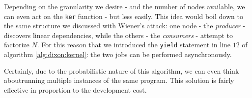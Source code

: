 Depending on the granularity we desire - and the number of nodes available, we
can even act on the \texttt{ker} function - but less easily.
This idea would boil down to the same structure we discussed with Wiener's attack:
one node - the \emph{producer} - discovers linear dependencies, while the others
- the \emph{consumers} - attempt to factorize $N$.
For this reason that we introduced the \texttt{yield} statement in line
$12$ of algorithm \ref{alg:dixon:kernel}: the two jobs can be performed
asynchronously.

Certainly, due to the probabilistic nature of this algorithm, we can even think
aboutrunning multiple instances of the same program. This solution is fairly
effective in proportion to the development cost.

